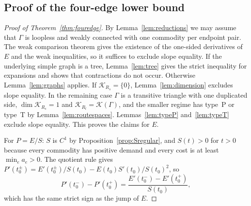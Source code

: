 \subsection{Proof of the four-edge lower bound}

\begin{proof}[Proof of Theorem~\ref{thm:fouredge}]
By Lemma~\ref{lem:reductions} we may assume that $\Gamma$ is loopless and
weakly connected with one commodity per endpoint pair. The weak comparison
theorem gives the existence of the one-sided derivatives of $E$ and the weak
inequalities, so it suffices to exclude slope equality. If the underlying
simple graph is a tree, Lemma~\ref{lem:tree} gives the strict inequality for
expansions and shows that contractions do not occur. Otherwise
Lemma~\ref{lem:graphs} applies. If $\mathcal K_{R_s}=\{0\}$,
Lemma~\ref{lem:dimension} excludes slope equality. In the remaining case
$\Gamma$ is a transitive triangle with one duplicated side,
$\dim\mathcal K_{R_s}=1$ and $\mathcal K_{R_l}=\mathcal K(\Gamma)$, and the
smaller regime has type~P or type~T by Lemma~\ref{lem:routespaces}.
Lemmas~\ref{lem:typeP} and~\ref{lem:typeT} exclude slope equality. This proves
the claims for $E$.

For $P=E/S$: $S$ is $C^1$ by Proposition~\ref{prop:Sregular}, and $S(t)>0$
for $t>0$ because every commodity has positive demand and every cost is at
least $\min_ea_e>0$. The quotient rule gives
$P'(t_0^\pm)=E'(t_0^\pm)/S(t_0)-E(t_0)S'(t_0)/S(t_0)^2$, so
\[
 P'(t_0^-)-P'(t_0^+)=\frac{E'(t_0^-)-E'(t_0^+)}{S(t_0)},
\]
which has the same strict sign as the jump of $E$.
\end{proof}


